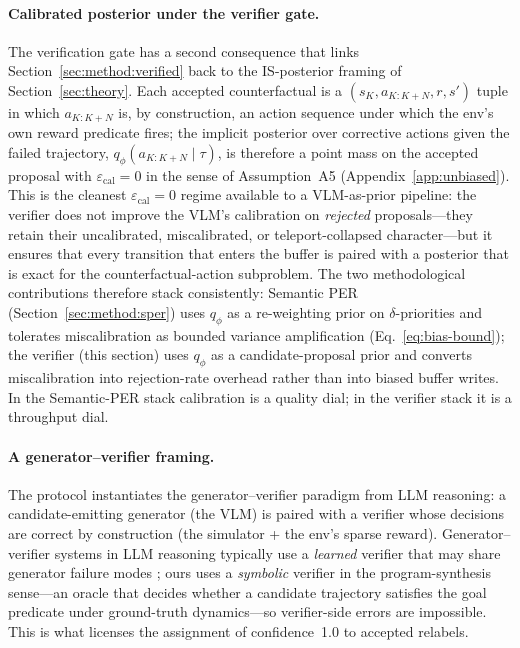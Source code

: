 \documentclass{article}
\begin{document}
\paragraph{Calibrated posterior under the verifier gate.}
The verification gate has a second consequence that links Section~\ref{sec:method:verified}
back to the IS-posterior framing of Section~\ref{sec:theory}. Each accepted
counterfactual is a $(s_K,a_{K:K+N},r,s')$ tuple in which $a_{K:K+N}$ is, by
construction, an action sequence under which the env's own reward predicate
fires; the implicit posterior over corrective actions given the failed
trajectory, $q_\phi(a_{K:K+N}\!\mid\!\tau)$, is therefore a point mass on the
accepted proposal with $\varepsilon_{\text{cal}}\!=\!0$ in the sense of
Assumption~A5 (Appendix~\ref{app:unbiased}). This is the cleanest
$\varepsilon_{\text{cal}}\!=\!0$ regime available to a VLM-as-prior pipeline:
the verifier does not improve the VLM's calibration on \emph{rejected}
proposals---they retain their uncalibrated, miscalibrated, or
teleport-collapsed character---but it ensures that every transition that
enters the buffer is paired with a posterior that is exact for the
counterfactual-action subproblem. The two methodological contributions
therefore stack consistently: Semantic PER (Section~\ref{sec:method:sper})
uses $q_\phi$ as a re-weighting prior on $\delta$-priorities and tolerates
miscalibration as bounded variance amplification
(Eq.~\ref{eq:bias-bound}); the verifier (this section) uses $q_\phi$ as a
candidate-proposal prior and converts miscalibration into rejection-rate
overhead rather than into biased buffer writes. In the Semantic-PER stack
calibration is a quality dial; in the verifier stack it is a throughput dial.

\paragraph{A generator--verifier framing.}
The protocol instantiates the generator--verifier paradigm
\citep{zha2025tango} from LLM reasoning: a candidate-emitting generator (the
VLM) is paired with a verifier whose decisions are correct by construction
(the simulator + the env's sparse reward). Generator--verifier systems in LLM
reasoning typically use a \emph{learned} verifier that may share generator
failure modes \citep{wu2025rlvrworld}; ours uses a \emph{symbolic} verifier
in the program-synthesis sense---an oracle that decides whether a candidate
trajectory satisfies the goal predicate under ground-truth dynamics---so
verifier-side errors are impossible. This is what licenses the assignment of
confidence~1.0 to accepted relabels.
\end{document}
